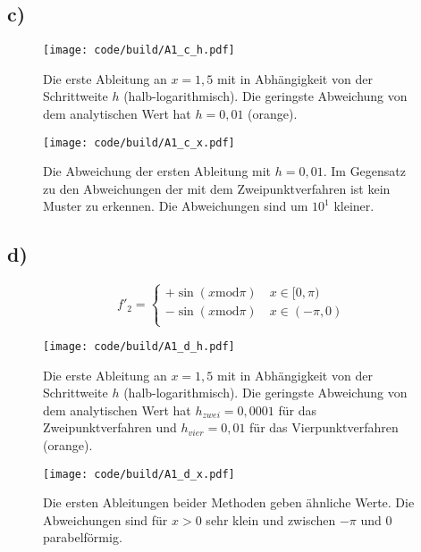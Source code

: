\subsection{c)}
\begin{figure}
    \centering
    \texttt{[image: code/build/A1\_c\_h.pdf]}
    \caption{Die erste Ableitung an $x=1,5$ mit in Abhängigkeit von der Schrittweite $h$ (halb-logarithmisch).
    Die geringste Abweichung von dem analytischen Wert hat $h=0,01$ (orange).}
\end{figure}

\begin{figure}
    \centering
    \texttt{[image: code/build/A1\_c\_x.pdf]}
    \caption{Die Abweichung der ersten Ableitung mit $h=0,01$. 
    Im Gegensatz zu den Abweichungen der mit dem Zweipunktverfahren ist kein Muster zu erkennen.
    Die Abweichungen sind um $10^1$ kleiner.}
\end{figure}
\FloatBarrier
\FloatBarrier
\subsection{d)}
\begin{equation}
    f'_2= 
    \begin{cases}
         + \sin(x \text{mod} \pi) \quad x \in [0,\pi)\\
         - \sin(x \text{mod}  \pi) \quad x \in (-\pi, 0) \\
    \end{cases}
\end{equation}

\begin{figure}
    \centering
    \texttt{[image: code/build/A1\_d\_h.pdf]}
    \caption{Die erste Ableitung an $x=1,5$ mit in Abhängigkeit von der Schrittweite $h$ (halb-logarithmisch).
    Die geringste Abweichung von dem analytischen Wert hat $h_{zwei}=0,0001$ für das Zweipunktverfahren und $h_{vier}=0,01$ für das Vierpunktverfahren (orange).}
\end{figure}

\begin{figure}
    \centering
    \texttt{[image: code/build/A1\_d\_x.pdf]}
    \caption{Die ersten Ableitungen beider Methoden geben ähnliche Werte.
    Die Abweichungen sind für $x>0$ sehr klein
    und zwischen $-\pi$ und $0$ parabelförmig.}
\end{figure}

